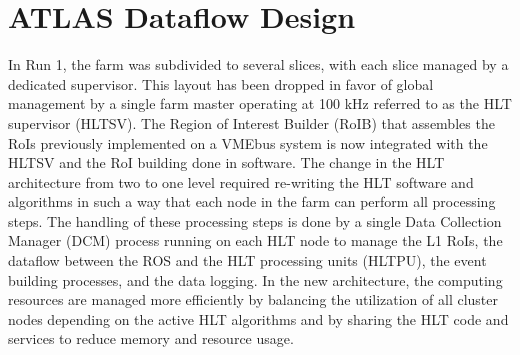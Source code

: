 

\section{ATLAS Dataflow Design}

In Run 1, the farm was subdivided to several slices, with 
each slice managed by a dedicated supervisor. This layout has been 
dropped in favor of global management by a single farm master 
operating at 100 kHz referred to as the HLT supervisor (HLTSV). 
The Region of Interest Builder (RoIB) that assembles the RoIs
previously implemented on a VMEbus 
system is now integrated with the HLTSV and the RoI building done in software. 
The change in the HLT architecture from two to one level
required re-writing the HLT software and algorithms in such a way that 
each node in the farm can perform all processing steps. The handling of these
processing steps is done by a single Data Collection Manager (DCM) process 
running on each HLT node to manage the L1 RoIs, the dataflow 
between the ROS and the HLT processing units (HLTPU), 
the event building processes, and the data logging.
 In the new architecture, the computing resources are managed more efficiently
by balancing the utilization of all cluster nodes depending on the active HLT 
algorithms and by sharing the HLT code and services to reduce memory and 
resource usage. 

